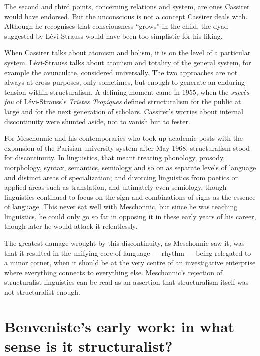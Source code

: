 \documentclass[output=paper]{langscibook}
\begin{document}
The second and third points, concerning relations and system, are ones Cassirer would have endorsed. But the unconscious is not a concept Cassirer deals with. Although he recognises that consciousness ``grows'' in the child, the dyad suggested by Lévi-Strauss would have been too simplistic for his liking.

When Cassirer talks about atomism and holism, it is on the level of a particular system. Lévi-Strauss talks about atomism and totality of the general system, for example the avunculate, considered universally. The two approaches are not always at cross purposes, only sometimes, but enough to generate an enduring tension within structuralism. A defining moment came in 1955, when the \emph{succès fou} of Lévi-Strauss’s \emph{Tristes Tropiques} defined structuralism for the public at large and for the next generation of scholars. Cassirer’s worries about internal discontinuity were shunted aside, not to vanish but to fester.

For Meschonnic and his contemporaries who took up academic posts with the expansion of the Parisian university system after May 1968, structuralism stood for discontinuity. In linguistics, that meant treating phonology, prosody, morphology, syntax, semantics, semiology and so on as separate levels of language and distinct areas of specialization; and divorcing linguistics from poetics or applied areas such as translation, and ultimately even semiology, though linguistics continued to focus on the sign and combinations of signs as the essence of language. This never sat well with Meschonnic, but since he was teaching linguistics, he could only go so far in opposing it in these early years of his career, though later he would attack it relentlessly.

The greatest damage wrought by this discontinuity, as Meschonnic saw it, was that it resulted in the unifying core of language — rhythm — being relegated to a minor corner, when it should be at the very centre of an investigative enterprise where everything connects to everything else. Meschonnic's rejection of structuralist linguistics can be read as an assertion that structuralism itself was not structuralist enough.

\section{Benveniste’s early work: in what sense is it structuralist?}
\label{sec:joseph:earlywork}
\end{document}
